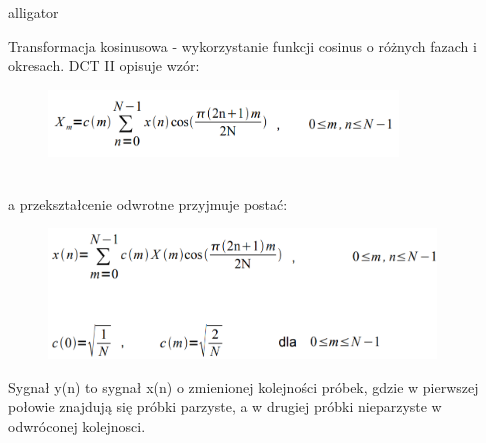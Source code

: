 \documentclass[12pt]{article}
\begin{document}
\begin{labeling}{alligator}

\item [Transformacja kosinusowa] - wykorzystanie funkcji cosinus o różnych fazach i okresach. DCT II opisuje wzór:
\begin{figure}[h!]
 \centering
 \includegraphics[width=9.3cm]{DCT2.PNG}
 \vspace{-0.3cm}
 \label{kr}
\end{figure}
\\ a przekształcenie odwrotne przyjmuje postać: 
\begin{figure}[h!]
 \centering
 \includegraphics[width=10.3cm]{DCT2O.PNG}
 \vspace{-0.3cm}
 \label{kw}
\end{figure}

Sygnał y(n) to sygnał x(n) o zmienionej kolejności próbek, gdzie w pierwszej połowie znajdują się próbki parzyste, a w drugiej próbki nieparzyste w odwróconej kolejnosci.





\end{labeling}
\end{document}
